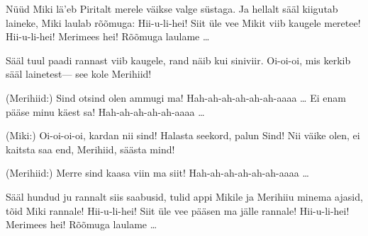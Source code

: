 N\"u\"ud Miki l\"a'eb Piritalt merele
v\"aikse valge s\"ustaga.
Ja hellalt s\"a\"al kiigutab laineke,
Miki laulab r\~o\~omuga:
Hii-u-li-hei! Siit \"ule vee
Mikit viib kaugele meretee!
Hii-u-li-hei! Merimees hei!
R\~o\~omuga laulame \ldots

S\"a\"al tuul paadi rannast viib kaugele,
rand n\"aib kui siniviir.
Oi-oi-oi, mis kerkib s\"a\"al lainetest---
see kole Merihiid!

(Merihiid:)
Sind otsind olen ammugi ma!
Hah-ah-ah-ah-ah-ah-aaaa \ldots
Ei enam p\"a\"ase minu k\"aest sa!
Hah-ah-ah-ah-ah-aaaa \ldots

(Miki:)
Oi-oi-oi-oi, kardan nii sind!
Halasta seekord, palun Sind!
Nii v\"aike olen, ei kaitsta saa end,
Merihiid, s\"a\"asta mind!

(Merihiid:)
Merre sind kaasa viin ma siit!
Hah-ah-ah-ah-ah-ah-aaaa \ldots

S\"a\"al hundud ju rannalt siis saabusid,
tulid appi Mikile
ja Merihiiu minema ajasid,
t\~oid Miki rannale!
Hii-u-li-hei! Siit \"ule vee
p\"a\"asen ma j\"alle rannale!
Hii-u-li-hei! Merimees hei!
R\~o\~omuga laulame \ldots